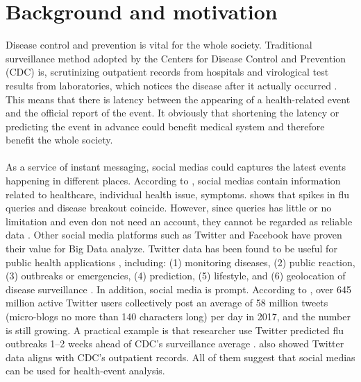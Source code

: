 \section{Background and motivation}
Disease control and prevention is vital for the whole society. Traditional surveillance method adopted by the Centers for Disease Control and Prevention (CDC) is, scrutinizing outpatient records from hospitals and virological test results from laboratories, which notices the disease after it actually occurred \cite{schmidt2012trending}. This means that there is latency between the appearing of a health-related event and the official report of the event. It obviously that shortening the latency or predicting the event in advance could benefit medical system and therefore benefit the whole society. 
\\\\
As a service of instant messaging, social medias could captures the latest events happening in different places. 
According to \cite{lee2013real}, social medias contain information related to healthcare, individual health issue, symptoms. \cite{ginsberg2009detecting} shows that spikes in flu queries and disease breakout coincide. However, since queries has little or no limitation and even don not need an account, they cannot be regarded as reliable data \cite{schmidt2012trending}. Other social media platforms such as Twitter and Facebook have proven their value for Big Data analyze. Twitter data has been found to be useful for public health applications \cite{denecke2009valuable}, including: (1) monitoring diseases, (2) public reaction, (3) outbreaks or emergencies, (4) prediction, (5) lifestyle, and (6) geolocation of disease surveillance \cite{andreu2015big}. In addition, social media is prompt. According to \cite{elkin2017network}, over 645 million active Twitter users collectively post an average of 58 million tweets (micro-blogs no more than 140 characters long) per day in 2017, and the number is still growing. A practical example is that researcher use Twitter predicted flu outbreaks 1–2 weeks ahead of CDC’s surveillance average \cite{signorini2011use}. \cite{elkin2017network} also showed Twitter data aligns with CDC’s outpatient records. All of them suggest that social medias can be used for health-event analysis.\\


